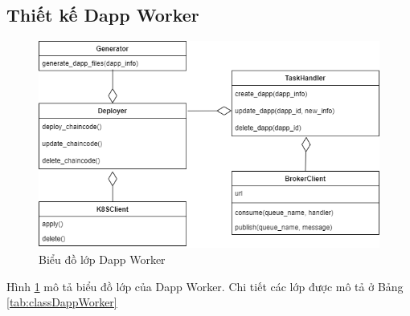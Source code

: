 \documentclass[../DoAn.tex]{subfiles}
\begin{document}
\subsection{Thiết kế Dapp Worker}

\begin{figure}[H]
    \centering
    \includegraphics[width=0.75\linewidth]{Hinhve/DoAn-ClassDappWorker.drawio.png}
    \caption{Biểu đồ lớp Dapp Worker}
    \label{fig:classDappWorker}
\end{figure}

Hình \ref{fig:classDappWorker} mô tả biểu đồ lớp của Dapp Worker. Chi tiết các
lớp được mô tả ở Bảng \ref{tab:classDappWorker}
\end{document}
